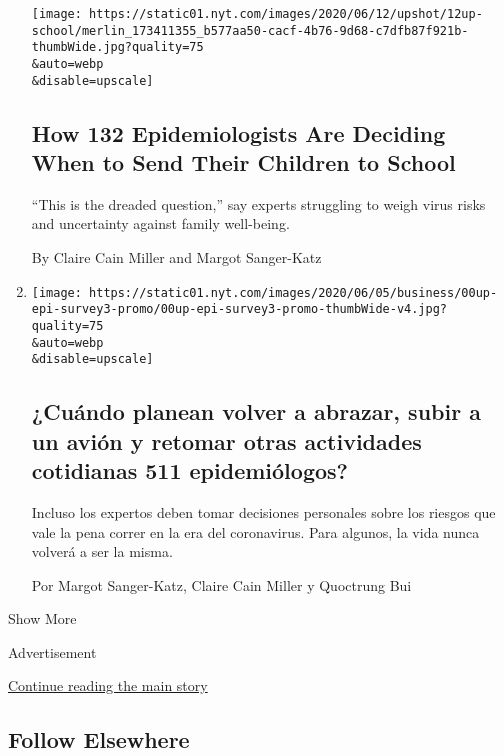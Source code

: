 \begin{enumerate}
  \texttt{[image: https://static01.nyt.com/images/2020/06/12/upshot/12up-school/merlin\_173411355\_b577aa50-cacf-4b76-9d68-c7dfb87f921b-thumbWide.jpg?quality=75\\\&auto=webp\\\&disable=upscale]}

  \hypertarget{how-132-epidemiologists-are-deciding-when-to-send-their-children-to-school}{%
  \subsection{How 132 Epidemiologists Are Deciding When to Send Their
  Children to
  School}\label{how-132-epidemiologists-are-deciding-when-to-send-their-children-to-school}}

  ``This is the dreaded question,'' say experts struggling to weigh
  virus risks and uncertainty against family well-being.

  By Claire Cain Miller and Margot Sanger-Katz
\item
  \href{/es/interactive/2020/06/10/espanol/ciencia-y-tecnologia/epidemiologos-recomendaciones-normalidad.html}{}

  \texttt{[image: https://static01.nyt.com/images/2020/06/05/business/00up-epi-survey3-promo/00up-epi-survey3-promo-thumbWide-v4.jpg?quality=75\\\&auto=webp\\\&disable=upscale]}

  \hypertarget{cuuxe1ndo-planean-volver-a-abrazar-subir-a-un-aviuxf3n-y-retomar-otras-actividades-cotidianas-511-epidemiuxf3logos}{%
  \subsection{¿Cuándo planean volver a abrazar, subir a un avión y
  retomar otras actividades cotidianas 511
  epidemiólogos?}\label{cuuxe1ndo-planean-volver-a-abrazar-subir-a-un-aviuxf3n-y-retomar-otras-actividades-cotidianas-511-epidemiuxf3logos}}

  Incluso los expertos deben tomar decisiones personales sobre los
  riesgos que vale la pena correr en la era del coronavirus. Para
  algunos, la vida nunca volverá a ser la misma.

  Por Margot Sanger-Katz, Claire Cain Miller y Quoctrung Bui
\end{enumerate}

Show More

Advertisement

\protect\hyperlink{after-mid2}{Continue reading the main story}

\hypertarget{follow-elsewhere}{%
\subsection{Follow Elsewhere}\label{follow-elsewhere}}

